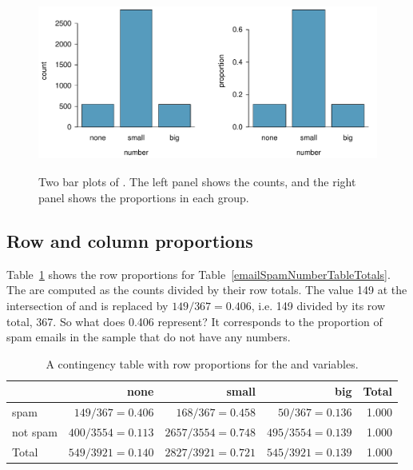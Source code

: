 \begin{figure}[bht]
   \centering
   \includegraphics[height=2.3in]{ch_summarizing_data/figures/emailNumberBarPlot/emailNumberBarPlot}
   \caption{Two bar plots of . The left panel shows the counts, and the right panel shows the proportions in each group.}
   \label{emailNumberBarPlot}
\end{figure}


\subsection{Row and column proportions}

Table~\ref{rowPropSpamNumber} shows the row proportions for Table~\ref{emailSpamNumberTableTotals}. The  are computed as the counts divided by their row totals. The value 149 at the intersection of  and  is replaced by $149/367=0.406$, i.e. 149 divided by its row total, 367. So what does 0.406 represent? It corresponds to the proportion of spam emails in the sample that do not have any numbers.

\begin{table}[ht]
\centering
\begin{tabular}{l rrr r}
  \hline
 & none & small & big & Total \\
  \hline
spam &  $149/367 = 0.406$ & $168/367 = 0.458$ &
			$50/367 = 0.136$ & 1.000 \\
not spam &  $400/3554 = 0.113$ & $2657/3554 = 0.748$ &
			$495/3554 = 0.139$ & 1.000 \\
   \hline
Total & $549/3921 = 0.140$ & $2827/3921 = 0.721$ &
			$545/3921 = 0.139$ & 1.000 \\
  \hline
\end{tabular}
\caption{A contingency table with row proportions for the  and  variables.}
\label{rowPropSpamNumber}
\end{table}

